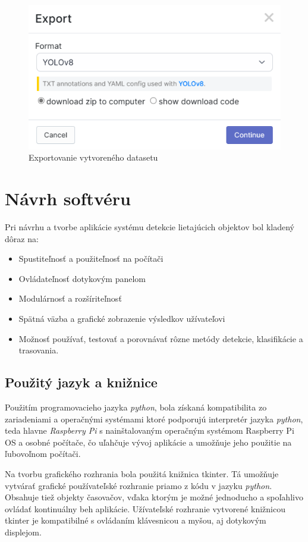     \begin{figure}[H]
        \centering
        \includegraphics[width=.5\textwidth]{obrazky/roboflow/export.png}
        \caption{Exportovanie vytvoreného datasetu}
    \end{figure}

\chapter{Návrh softvéru}

    Pri návrhu a tvorbe aplikácie systému detekcie lietajúcich objektov bol kladený dôraz na:
    \begin{itemize}
        \item Spustiteľnosť a použiteľnosť na počítači
        \item Ovládateľnosť dotykovým panelom
        \item Modulárnosť a rozšíriteľnosť
        \item Spätná väzba a grafické zobrazenie výsledkov užívateľovi
        \item Možnosť používať, testovať a porovnávať rôzne metódy detekcie, klasifikácie a trasovania.
    \end{itemize}

    \section{Použitý jazyk a knižnice}

        Použitím programovacieho jazyka \emph{python}, bola získaná kompatibilita zo zariadeniami a operačnými systémami ktoré podporujú interpretér jazyka \emph{python}, teda hlavne \emph{Raspberry Pi} s nainštalovaným operačným systémom Raspberry Pi OS a osobné počítače, čo uľahčuje vývoj aplikácie a umožňuje jeho použitie na ľubovoľnom počítači.

        Na tvorbu grafického rozhrania bola použitá knižnica \ac{tkinter}. Tá umožňuje vytvárať grafické používateľské rozhranie priamo z kódu v jazyku \emph{python}. Obsahuje tiež objekty časovačov, vďaka ktorým je možné jednoducho a spoľahlivo ovládať kontinuálny beh aplikácie. Užívateľské rozhranie vytvorené knižnicou \ac{tkinter} je kompatibilné s ovládaním klávesnicou a myšou, aj dotykovým displejom.

